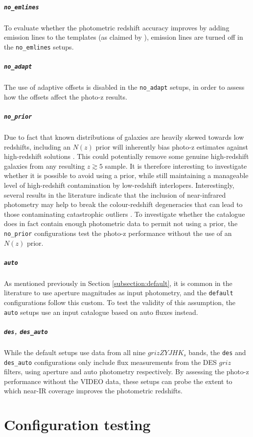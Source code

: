 \subparagraph{\texttt{no\_emlines}} To evaluate whether the photometric redshift accuracy improves by adding emission lines to the templates (as claimed by \citealt{2009ApJ...690.1236I}), emission lines are turned off in the \texttt{no\_emlines} setups.

\subparagraph{\texttt{no\_adapt}} The use of adaptive offsets is disabled in the  \texttt{no\_adapt} setups, in order to assess how the offsets affect the photo-z results. 

\subparagraph{\texttt{no\_prior}} Due to fact that known distributions of galaxies are heavily skewed towards low redshifts, including an $N(z)$ prior will inherently bias photo-z estimates against high-redshift solutions \citep{2000ApJ...536..571B}. This could potentially remove some genuine high-redshift galaxies from any resulting $z\gtrsim5$ sample. It is therefore interesting to investigate whether it is possible to avoid using a prior, while still maintaining a manageable level of high-redshift contamination by low-redshift interlopers. Interestingly, several results in the literature indicate that the inclusion of near-infrared photometry may help to break the colour-redshift degeneracies that can lead to those contaminating catastrophic outliers \citep{2000ApJ...536..571B,2006A&A...457..841I}. To investigate whether the \DESVIDEO catalogue does in fact contain enough photometric data to permit not using a prior, the \texttt{no\_prior} configurations test the photo-z performance without the use of an $N(z)$ prior. 
 

\subparagraph{\texttt{auto}} As mentioned previously in Section \ref{subsection:default}, it is common in the literature to use aperture magnitudes as input photometry, and the \texttt{default} configurations follow this custom. To test the validity of this assumption, the \texttt{auto} setups use an input catalogue based on auto fluxes instead. 



\subparagraph{\texttt{des}, \texttt{des\_auto}} While the default setups use data from all nine $grizZYJHK_{s}$ \DESVIDEO bands, the \texttt{des} and \texttt{des\_auto} configurations only include flux measurements from the DES $griz$ filters, using aperture and auto photometry respectively. By assessing the photo-z performance without the VIDEO data, these setups can probe the extent to which near-IR coverage improves the photometric redshifts.



\section{Configuration testing}\label{section:photoz_computation}
